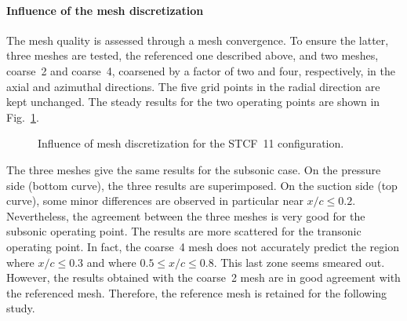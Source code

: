 \paragraph{Influence of the mesh discretization}
\label{sub:stcf11_mesh_convergence}
The mesh quality is assessed through a mesh convergence.
To ensure the latter, three meshes are tested, the referenced one
described above, and two meshes, coarse~2 and coarse~4,
coarsened by a factor of two and four, respectively, in the axial and
azimuthal directions. The five grid points in the radial direction
are kept unchanged.
The steady results for the two operating points are shown 
in Fig.~\ref{fig:stcf11_mesh_convergence}.
\begin{figure}[htp]
  \centering
  \caption{Influence of mesh discretization for the STCF~11 configuration.}
  \label{fig:stcf11_mesh_convergence}
\end{figure}
The three meshes give the same results for the subsonic case. On the
pressure side (bottom curve), the three results are superimposed. On the suction side
(top curve),
some minor differences are observed in particular near
$x / c \leq 0.2$. Nevertheless, the agreement
between the three meshes is very good for the subsonic operating point.
The results are more scattered for the transonic operating point. In fact,
the coarse~4 mesh does not accurately predict the region where $x / c \leq 0.3$
and where $0.5 \leq x / c \leq 0.8$. This last zone seems smeared out. 
However, the results
obtained with the coarse~2 mesh are in good agreement with the referenced mesh.
Therefore, the reference mesh is retained for the following study.

